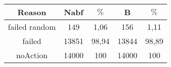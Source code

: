\documentclass{article}
\begin{document}
\begin{tabular}{|c||c|c||c|c|}
\hline
Reason&Nabf& $\%$&B& $\%$\\
\hline
failed random&149&1,06&156&1,11\\

failed&13851&98,94&13844&98,89\\

noAction&14000&100&14000&100\\
\hline
\end{tabular}
\end{document}

